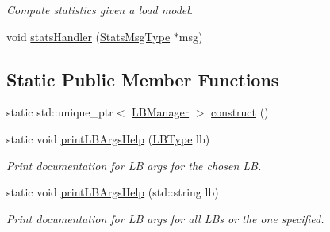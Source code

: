 \begin{DoxyCompactItemize}
\begin{DoxyCompactList}\small\item\em Compute statistics given a load model. \end{DoxyCompactList}\item 
void \hyperlink{structvt_1_1vrt_1_1collection_1_1balance_1_1_l_b_manager_ac068db6bbf9109fc15786b1298279f87}{stats\+Handler} (\hyperlink{structvt_1_1vrt_1_1collection_1_1balance_1_1_l_b_manager_afedd89b1c2db43f087c1757db6200d36}{Stats\+Msg\+Type} $\ast$msg)
\end{DoxyCompactItemize}
\subsection*{Static Public Member Functions}
\begin{DoxyCompactItemize}
\item 
static std\+::unique\+\_\+ptr$<$ \hyperlink{structvt_1_1vrt_1_1collection_1_1balance_1_1_l_b_manager}{L\+B\+Manager} $>$ \hyperlink{structvt_1_1vrt_1_1collection_1_1balance_1_1_l_b_manager_ae8e69a0540bb87b40ee86d2c1fe31cd5}{construct} ()
\item 
static void \hyperlink{structvt_1_1vrt_1_1collection_1_1balance_1_1_l_b_manager_a313786fd69d0687572b0465e37acb9aa}{print\+L\+B\+Args\+Help} (\hyperlink{namespacevt_1_1vrt_1_1collection_1_1balance_ac4f99693509affcc67db182d4aad9b5c}{L\+B\+Type} lb)
\begin{DoxyCompactList}\small\item\em Print documentation for LB args for the chosen LB. \end{DoxyCompactList}\item 
static void \hyperlink{structvt_1_1vrt_1_1collection_1_1balance_1_1_l_b_manager_a53276c3cae8d6c50305d8940ee983ebf}{print\+L\+B\+Args\+Help} (std\+::string lb)
\begin{DoxyCompactList}\small\item\em Print documentation for LB args for all L\+Bs or the one specified. \end{DoxyCompactList}\end{DoxyCompactItemize}
